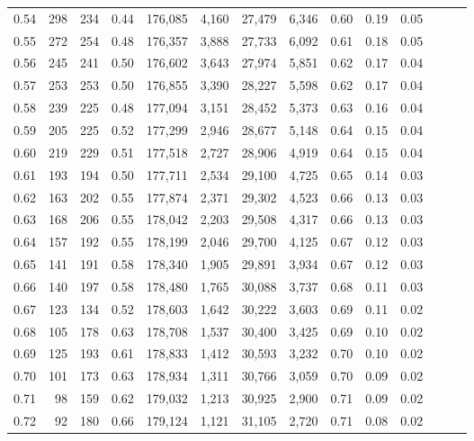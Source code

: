 \begin{tabular}{rrrrrrrrrrrrrr}
0.54 &     298 &  234 &  0.44 &  176,085 &    4,160 &  27,479 &   6,346 &  0.60 &  0.19 &      0.05 \\
0.55 &     272 &  254 &  0.48 &  176,357 &    3,888 &  27,733 &   6,092 &  0.61 &  0.18 &      0.05 \\
0.56 &     245 &  241 &  0.50 &  176,602 &    3,643 &  27,974 &   5,851 &  0.62 &  0.17 &      0.04 \\
0.57 &     253 &  253 &  0.50 &  176,855 &    3,390 &  28,227 &   5,598 &  0.62 &  0.17 &      0.04 \\
0.58 &     239 &  225 &  0.48 &  177,094 &    3,151 &  28,452 &   5,373 &  0.63 &  0.16 &      0.04 \\
0.59 &     205 &  225 &  0.52 &  177,299 &    2,946 &  28,677 &   5,148 &  0.64 &  0.15 &      0.04 \\
0.60 &     219 &  229 &  0.51 &  177,518 &    2,727 &  28,906 &   4,919 &  0.64 &  0.15 &      0.04 \\
0.61 &     193 &  194 &  0.50 &  177,711 &    2,534 &  29,100 &   4,725 &  0.65 &  0.14 &      0.03 \\
0.62 &     163 &  202 &  0.55 &  177,874 &    2,371 &  29,302 &   4,523 &  0.66 &  0.13 &      0.03 \\
0.63 &     168 &  206 &  0.55 &  178,042 &    2,203 &  29,508 &   4,317 &  0.66 &  0.13 &      0.03 \\
0.64 &     157 &  192 &  0.55 &  178,199 &    2,046 &  29,700 &   4,125 &  0.67 &  0.12 &      0.03 \\
0.65 &     141 &  191 &  0.58 &  178,340 &    1,905 &  29,891 &   3,934 &  0.67 &  0.12 &      0.03 \\
0.66 &     140 &  197 &  0.58 &  178,480 &    1,765 &  30,088 &   3,737 &  0.68 &  0.11 &      0.03 \\
0.67 &     123 &  134 &  0.52 &  178,603 &    1,642 &  30,222 &   3,603 &  0.69 &  0.11 &      0.02 \\
0.68 &     105 &  178 &  0.63 &  178,708 &    1,537 &  30,400 &   3,425 &  0.69 &  0.10 &      0.02 \\
0.69 &     125 &  193 &  0.61 &  178,833 &    1,412 &  30,593 &   3,232 &  0.70 &  0.10 &      0.02 \\
0.70 &     101 &  173 &  0.63 &  178,934 &    1,311 &  30,766 &   3,059 &  0.70 &  0.09 &      0.02 \\
0.71 &      98 &  159 &  0.62 &  179,032 &    1,213 &  30,925 &   2,900 &  0.71 &  0.09 &      0.02 \\
0.72 &      92 &  180 &  0.66 &  179,124 &    1,121 &  31,105 &   2,720 &  0.71 &  0.08 &      0.02 \\

\end{tabular}
